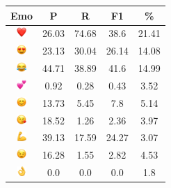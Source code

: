 \documentclass{article}
\begin{document}
\begin{table}
\centering
\begin{tabular}{|c|ccc|c|} \hline
\textbf{Emo} & \textbf{P} & \textbf{R} & \textbf{F1} & \textbf{\%} \\ \hline
\includegraphics[height=0.37cm,width=0.37cm]{img/red_heart.png} & 26.03 & 74.68 & 38.6 & 21.41\\ 
\includegraphics[height=0.37cm,width=0.37cm]{img/smiling_face_with_hearteyes.png} & 23.13 & 30.04 & 26.14 & 14.08\\ 
\includegraphics[height=0.37cm,width=0.37cm]{img/face_with_tears_of_joy.png} & 44.71 & 38.89 & 41.6 & 14.99\\ 
\includegraphics[height=0.37cm,width=0.37cm]{img/two_hearts.png} & 0.92 & 0.28 & 0.43 & 3.52\\ 
\includegraphics[height=0.37cm,width=0.37cm]{img/smiling_face_with_smiling_eyes.png} & 13.73 & 5.45 & 7.8 & 5.14\\ 
\includegraphics[height=0.37cm,width=0.37cm]{img/face_blowing_a_kiss.png} & 18.52 & 1.26 & 2.36 & 3.97\\ 
\includegraphics[height=0.37cm,width=0.37cm]{img/flexed_biceps.png} & 39.13 & 17.59 & 24.27 & 3.07\\ 
\includegraphics[height=0.37cm,width=0.37cm]{img/winking_face.png} & 16.28 & 1.55 & 2.82 & 4.53\\ 
\includegraphics[height=0.37cm,width=0.37cm]{img/OK_hand.png} & 0.0 & 0.0 & 0.0 & 1.8\\ 

\end{tabular}
\end{table}
\end{document}
